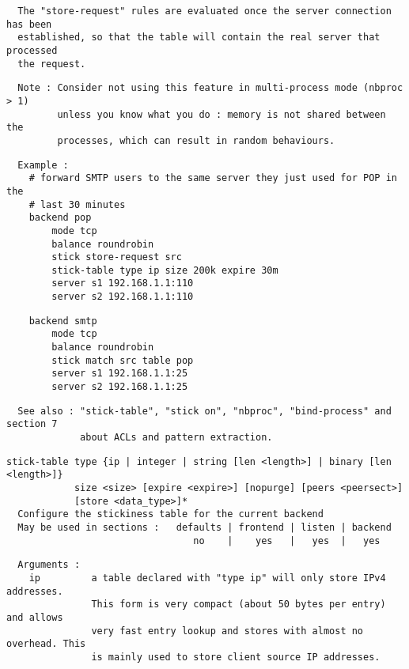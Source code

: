 \begin{verbatim}
  The "store-request" rules are evaluated once the server connection has been
  established, so that the table will contain the real server that processed
  the request.
\end{verbatim}

\begin{verbatim}
  Note : Consider not using this feature in multi-process mode (nbproc > 1)
         unless you know what you do : memory is not shared between the
         processes, which can result in random behaviours.
\end{verbatim}

\begin{verbatim}
  Example :
    # forward SMTP users to the same server they just used for POP in the
    # last 30 minutes
    backend pop
        mode tcp
        balance roundrobin
        stick store-request src
        stick-table type ip size 200k expire 30m
        server s1 192.168.1.1:110
        server s2 192.168.1.1:110
\end{verbatim}

\begin{verbatim}
    backend smtp
        mode tcp
        balance roundrobin
        stick match src table pop
        server s1 192.168.1.1:25
        server s2 192.168.1.1:25
\end{verbatim}

\begin{verbatim}
  See also : "stick-table", "stick on", "nbproc", "bind-process" and section 7
             about ACLs and pattern extraction.
\end{verbatim}

\begin{verbatim}
stick-table type {ip | integer | string [len <length>] | binary [len <length>]}
            size <size> [expire <expire>] [nopurge] [peers <peersect>]
            [store <data_type>]*
  Configure the stickiness table for the current backend
  May be used in sections :   defaults | frontend | listen | backend
                                 no    |    yes   |   yes  |   yes
\end{verbatim}

\begin{verbatim}
  Arguments :
    ip         a table declared with "type ip" will only store IPv4 addresses.
               This form is very compact (about 50 bytes per entry) and allows
               very fast entry lookup and stores with almost no overhead. This
               is mainly used to store client source IP addresses.
\end{verbatim}

